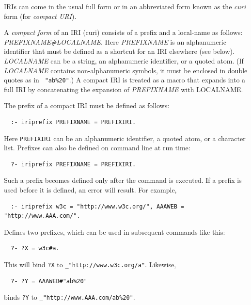 \documentclass[11pt]{article}
\begin{document}
IRIs can come in the usual full form or in an abbreviated form
known as the \emph{curi} form (for \emph{compact URI}).  

\index{\#}
A \emph{compact form} of an IRI (curi) consists of a
prefix and a local-name as follows: \emph{PREFIXNAME\#LOCALNAME}. Here
\emph{PREFIXNAME} is an alphanumeric identifier that must be defined as a
shortcut for an IRI elsewhere (see below). \emph{LOCALNAME} can be a string,
an alphanumeric identifier, or a quoted atom. (If \emph{LOCALNAME} contains
non-alphanumeric symbols, it must be enclosed in double quotes as in {\tt
  "ab\%20"}.) A compact IRI is treated as a macro that expands into a full IRI
by concatenating the expansion of \emph{PREFIXNAME}
with LOCALNAME.

The prefix of a compact IRI must be defined as follows:
\begin{verbatim}
  :- iriprefix PREFIXNAME = PREFIXIRI. 
\end{verbatim}
Here {\tt PREFIXIRI}  can be an alphanumeric identifier, a
quoted atom, or a character list. Prefixes can also be defined on
command line at run time:
\begin{verbatim}
  ?- iriprefix PREFIXNAME = PREFIXIRI. 
\end{verbatim}
Such a prefix becomes defined only after the command is executed.
If a prefix is used before it is defined, an error will result.
For example,
\begin{verbatim}
  :- iriprefix w3c = "http://www.w3c.org/", AAAWEB = "http://www.AAA.com/". 
\end{verbatim}
Defines two prefixes, which can be used in subsequent commands like this:
\begin{verbatim}
  ?- ?X = w3c#a.
\end{verbatim}
This will bind {\tt ?X} to   {\tt \_"http://www.w3c.org/a"}. 
Likewise,
\begin{verbatim}
  ?- ?Y = AAAWEB#"ab%20" 
\end{verbatim}
binds {\tt ?Y} to {\tt \_"http://www.AAA.com/ab\%20"}. 
\end{document}
